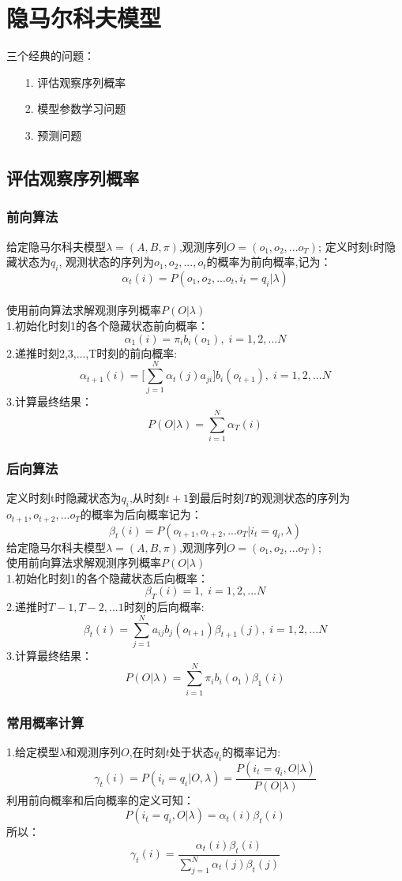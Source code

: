 \documentclass[UTF8]{article}%
\begin{document}
	\newpage
	\section{隐马尔科夫模型}
	
	三个经典的问题：
	\begin{enumerate}		
		\item[1.]评估观察序列概率
		\item[2.]模型参数学习问题
		\item[3.]预测问题
	\end{enumerate}
	
	\subsection{评估观察序列概率}
	
	\subsubsection{前向算法}
	给定隐马尔科夫模型$\lambda = (A,B,\pi)$,观测序列$O=(o_1,o_2,...o_T)$;
	定义时刻t时隐藏状态为$q_i$, 观测状态的序列为$o_1,o_2,...,o_t$的概率为前向概率,记为：
	$$\alpha_t(i) = P(o_1,o_2,...o_t, i_t =q_i | \lambda)$$
	\\使用前向算法求解观测序列概率$P(O|\lambda)$
	\\1.初始化时刻1的各个隐藏状态前向概率：$$\alpha_1(i) = \pi_ib_i(o_1),\; i=1,2,...N$$
	2.递推时刻2,3,...,T时刻的前向概率:$$\alpha_{t+1}(i) = \Big[\sum\limits_{j=1}^N\alpha_t(j)a_{ji}\Big]b_i(o_{t+1}),\; i=1,2,...N$$
	3.计算最终结果：$$P(O|\lambda) = \sum\limits_{i=1}^N\alpha_T(i)$$
	
	\subsubsection{后向算法}
	定义时刻t时隐藏状态为$q_i$,从时刻$t+1$到最后时刻$T$的观测状态的序列为$o_{t+1},o_{t+2},...o_T$的概率为后向概率记为：$$\beta_t(i) = P(o_{t+1},o_{t+2},...o_T| i_t =q_i , \lambda)$$
	给定隐马尔科夫模型$\lambda = (A,B,\pi)$,观测序列$O=(o_1,o_2,...o_T)$;
	\\使用前向算法求解观测序列概率$P(O|\lambda)$
	\\1.初始化时刻1的各个隐藏状态后向概率：$$\beta_T(i) = 1,\; i=1,2,...N$$
	2.递推时$T-1,T-2,...1$时刻的后向概率:$$\beta_{t}(i) = \sum\limits_{j=1}^{N}a_{ij}b_j(o_{t+1})\beta_{t+1}(j),\; i=1,2,...N$$
	3.计算最终结果：$$P(O|\lambda) = \sum\limits_{i=1}^N\pi_ib_i(o_1)\beta_1(i)$$
	
	\subsubsection{常用概率计算}
	1.给定模型$\lambda$和观测序列$O$,在时刻$t$处于状态$q_i$的概率记为:
	$$\gamma_t(i) = P(i_t = q_i | O,\lambda) = \frac{P(i_t = q_i ,O|\lambda)}{P(O|\lambda)}$$
	利用前向概率和后向概率的定义可知：$$P(i_t = q_i ,O|\lambda) = \alpha_t(i)\beta_t(i)$$
	所以：$$\gamma_t(i) = \frac{ \alpha_t(i)\beta_t(i)}{\sum\limits_{j=1}^N \alpha_t(j)\beta_t(j)}$$
	
\end{document}
